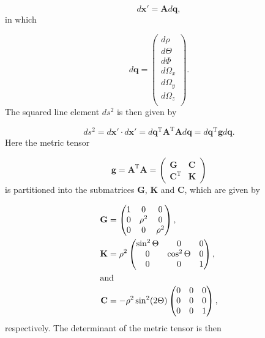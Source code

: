 \begin{equation}
d\mathbf{x}' = \mathbf{A}d\mathbf{q},
\end{equation} 
in which      

\begin{equation}
d\mathbf{q} =
\begin{pmatrix}
d\rho\\
d\Theta\\
d\Phi\\
d\Omega_x\\
d\Omega_y\\
d\Omega_z\\
\end{pmatrix}.
\end{equation}
The squared line element $d s^2$ is then given by 

\begin{equation}
d s^2 = d\mathbf{x}' \cdot d\mathbf{x}' = d\mathbf{q}^{\mathrm{T}} \mathbf{A}^{\mathrm{T}} \mathbf{A}d\mathbf{q} = d\mathbf{q}^{\mathrm{T}} \mathbf{g} d\mathbf{q}.
\end{equation}
Here the metric tensor

\begin{equation}
\mathbf{g}=\mathbf{A}^{\mathrm{T}} \mathbf{A}=
\begin{pmatrix}
\mathbf{G} & \mathbf{C}\\
\mathbf{C}^\mathrm{T} & \mathbf{K}
\end{pmatrix}
\end{equation}
is partitioned into the submatrices $\mathbf{G}$, $\mathbf{K}$ and $\mathbf{C}$, which are given by 

\begin{align}
\mathbf{G} &=
\begin{pmatrix}
1 & 0      & 0\\
0 & \rho^2 & 0\\
0 & 0      & \rho^2
\end{pmatrix},\\
\mathbf{K} &=
\rho^2
\begin{pmatrix}
\sin^2\Theta & 0            & 0\\
0            & \cos^2\Theta & 0\\
0            & 0            & 1
\end{pmatrix},\\
\intertext{and}
\mathbf{C} &=
-\rho^2\sin^2(2\Theta)
\begin{pmatrix}
0 & 0 & 0\\
0 & 0 & 0\\
0 & 0 & 1
\end{pmatrix},
\end{align}
respectively. The determinant of the metric tensor is then

